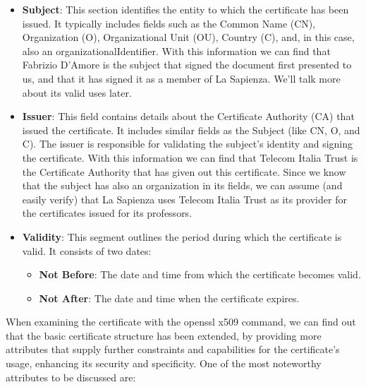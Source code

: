\documentclass{article}
\begin{document}
\begin{itemize} 
    \item \textbf{Subject}: This section identifies the entity to which the certificate has been issued. It typically includes fields such as the Common Name (CN), Organization (O), Organizational Unit (OU), Country (C), and, in this case, also an organizationalIdentifier. With this information we can find that Fabrizio D'Amore is the subject that signed the document first presented to us, and that it has signed it as a member of La Sapienza. We'll talk more about its valid uses later.
    \item \textbf{Issuer}: This field contains details about the Certificate Authority (CA) that issued the certificate. It includes similar fields as the Subject (like CN, O, and C). The issuer is responsible for validating the subject's identity and signing the certificate. 
    With this information we can find that Telecom Italia Trust is the Certificate Authority that has given out this certificate. Since we know that the subject has also an organization in its fields, we can assume (and easily verify) that La Sapienza uses Telecom Italia Trust as its provider for the certificates issued for its professors.
    \item \textbf{Validity}: This segment outlines the period during which the certificate is valid. It consists of two dates:
    \begin{itemize}
        \item \textbf{Not Before}: The date and time from which the certificate becomes valid.
        \item \textbf{Not After}: The date and time when the certificate expires.
    \end{itemize}

\end{itemize}
When examining the certificate with the openssl x509 command, we can find out that the basic certificate structure has been extended, by providing more attributes that supply further constraints and capabilities for the certificate's usage, enhancing its security and specificity. 
One of the most noteworthy attributes to be discussed are:
\end{document}
